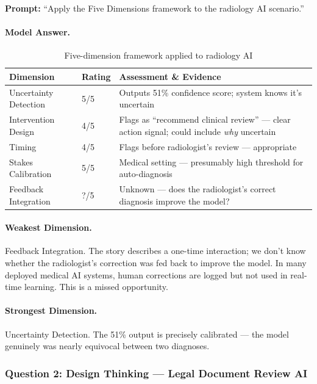 \textbf{Prompt:} ``Apply the Five Dimensions framework to the radiology AI scenario.''

\paragraph{Model Answer.}

\begin{table}[htbp]
\caption{Five-dimension framework applied to radiology AI}
\label{tab:radiology-five-dim}
\centering
\begin{tabular}{@{}p{3cm}p{2cm}p{7.5cm}@{}}
\toprule
\textbf{Dimension} & \textbf{Rating} & \textbf{Assessment \& Evidence} \\
\midrule
Uncertainty Detection & 5/5 & Outputs 51\% confidence score; system knows it's uncertain \\
Intervention Design & 4/5 & Flags as ``recommend clinical review'' --- clear action signal; could include \emph{why} uncertain \\
Timing & 4/5 & Flags before radiologist's review --- appropriate \\
Stakes Calibration & 5/5 & Medical setting --- presumably high threshold for auto-diagnosis \\
Feedback Integration & ?/5 & Unknown --- does the radiologist's correct diagnosis improve the model? \\
\bottomrule
\end{tabular}
\end{table}

\paragraph{Weakest Dimension.} Feedback Integration. The story describes a one-time interaction; we don't know whether the radiologist's correction was fed back to improve the model. In many deployed medical AI systems, human corrections are logged but not used in real-time learning. This is a missed opportunity.

\paragraph{Strongest Dimension.} Uncertainty Detection. The 51\% output is precisely calibrated --- the model genuinely was nearly equivocal between two diagnoses.

\subsubsection{Question 2: Design Thinking --- Legal Document Review AI}

